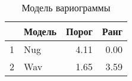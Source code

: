 \begin{table}[H]
\centering
\begin{tabular}{rlrr}
  \hline
 & Модель & Порог & Ранг \\ 
  \hline
1 & Nug & 4.11 & 0.00 \\ 
  2 & Wav & 1.65 & 3.59 \\ 
   \hline
\end{tabular}
\caption{Модель вариограммы} 
\label{table:manual_model}
\end{table}
